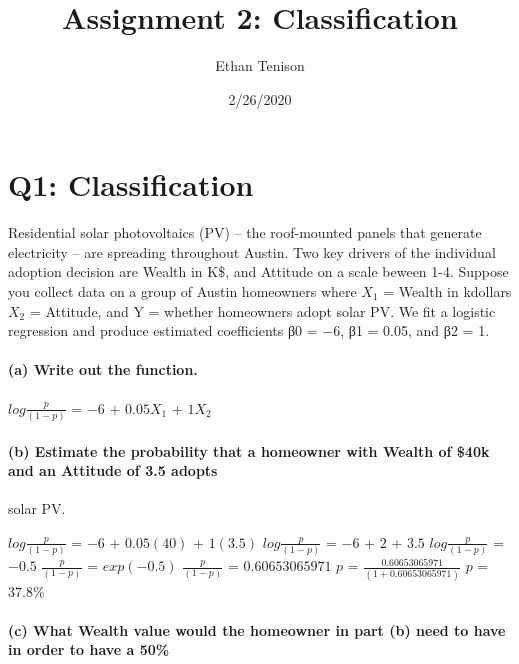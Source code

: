 \documentclass[]{article}
\title{Assignment 2: Classification}
\author{Ethan Tenison}
\date{2/26/2020}
\let\oldparagraph\paragraph
\renewcommand{\paragraph}[1]{\oldparagraph{#1}\mbox{}}
\begin{document}
\maketitle

\hypertarget{q1-classification}{%
\section{Q1: Classification}\label{q1-classification}}

Residential solar photovoltaics (PV) -- the roof-mounted panels that
generate electricity -- are spreading throughout Austin. Two key drivers
of the individual adoption decision are Wealth in K\$, and Attitude on a
scale beween 1-4. Suppose you collect data on a group of Austin
homeowners where \(X_{1}\) = Wealth in kdollars \(X_{2}\) = Attitude,
and Y = whether homeowners adopt solar PV. We fit a logistic regression
and produce estimated coefficients β0 = −6, β1 = 0.05, and β2 = 1.

\hypertarget{a-write-out-the-function.}{%
\paragraph{(a) Write out the
function.}\label{a-write-out-the-function.}}

\(log\)\(\frac{p}{(1-p)}\) = \(-6\) + \(0.05\)\(X_{1}\) + \(1\)\(X_{2}\)

\hypertarget{b-estimate-the-probability-that-a-homeowner-with-wealth-of-40k-and-an-attitude-of-3.5-adopts}{%
\paragraph{(b) Estimate the probability that a homeowner with Wealth of
\$40k and an Attitude of 3.5
adopts}\label{b-estimate-the-probability-that-a-homeowner-with-wealth-of-40k-and-an-attitude-of-3.5-adopts}}

solar PV.

\(log\)\(\frac{p}{(1-p)}\) = \(-6\) + \(0.05\)\((40)\) + \(1\)\((3.5)\)
\(log\)\(\frac{p}{(1-p)}\) = \(-6\) + \(2\) + \(3.5\)
\(log\)\(\frac{p}{(1-p)}\) = \(-0.5\) \(\frac{p}{(1-p)}\) =
\(exp\)\((-0.5)\) \(\frac{p}{(1-p)}\) = \(0.60653065971\) \(p\) =
\(\frac{0.60653065971}{(1+0.60653065971)}\) \(p\) = \(37.8\)\%

\hypertarget{c-what-wealth-value-would-the-homeowner-in-part-b-need-to-have-in-order-to-have-a-50}{%
\paragraph{(c) What Wealth value would the homeowner in part (b) need to
have in order to have a
50\%}\label{c-what-wealth-value-would-the-homeowner-in-part-b-need-to-have-in-order-to-have-a-50}}
\end{document}
